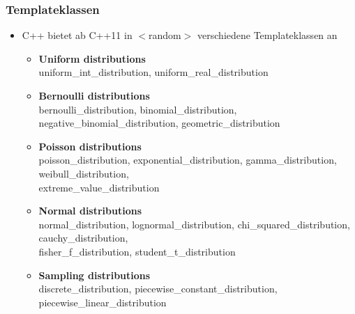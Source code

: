 \subsubsection{Templateklassen}
\begin{itemize}
	\item C++ bietet ab C++11 in $<$random$>$ verschiedene Templateklassen an
	\begin{itemize}
		\item \textbf{Uniform distributions}\\ uniform\_int\_distribution, uniform\_real\_distribution
		\item \textbf{Bernoulli distributions}\\ bernoulli\_distribution, binomial\_distribution, negative\_binomial\_distribution, geometric\_distribution
		\item \textbf{Poisson distributions}\\ poisson\_distribution, exponential\_distribution, gamma\_distribution, weibull\_distribution,\\extreme\_value\_distribution
		\item \textbf{Normal distributions}\\ normal\_distribution, lognormal\_distribution, chi\_squared\_distribution, cauchy\_distribution,\\fisher\_f\_distribution, student\_t\_distribution
		\item \textbf{Sampling distributions}\\ discrete\_distribution, piecewise\_constant\_distribution, piecewise\_linear\_distribution
	\end{itemize}
\end{itemize}

